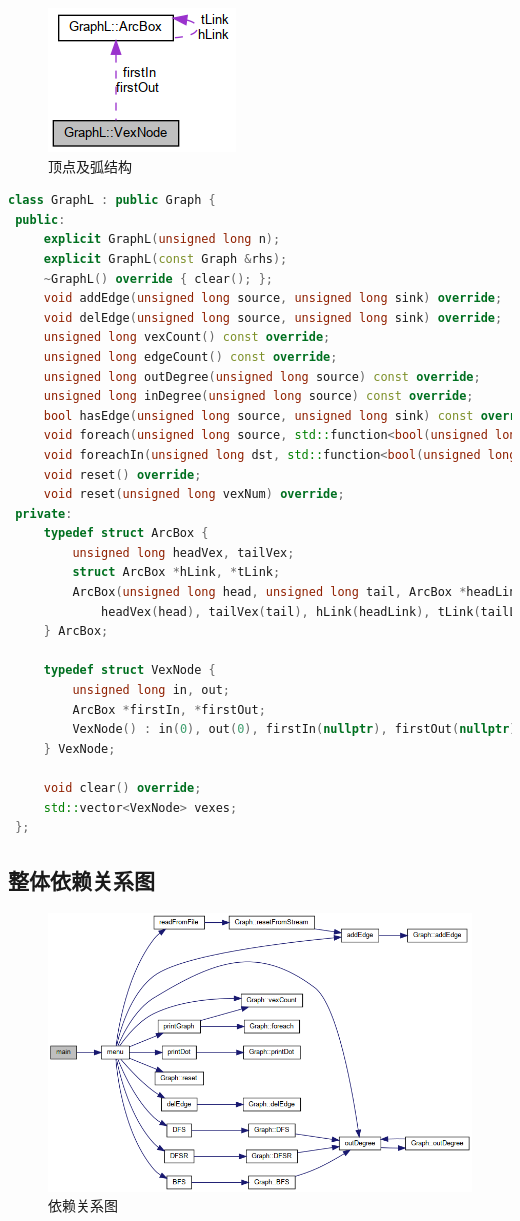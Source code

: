 \begin{figure}[H]
    \centering
    \includegraphics[width=0.2\linewidth]{figures/struct_graph_l_1_1_vex_node__coll__graph}
    \caption{顶点及弧结构}
    \label{fig:structgraphl11vexnodecollgraph}
\end{figure}

\begin{lstlisting}[language = c++]
 class GraphL : public Graph {
 public:
     explicit GraphL(unsigned long n);
     explicit GraphL(const Graph &rhs);
     ~GraphL() override { clear(); };
     void addEdge(unsigned long source, unsigned long sink) override;
     void delEdge(unsigned long source, unsigned long sink) override;
     unsigned long vexCount() const override;
     unsigned long edgeCount() const override;
     unsigned long outDegree(unsigned long source) const override;
     unsigned long inDegree(unsigned long source) const override;
     bool hasEdge(unsigned long source, unsigned long sink) const override;
     void foreach(unsigned long source, std::function<bool(unsigned long, unsigned long)> &func) const override;
     void foreachIn(unsigned long dst, std::function<bool(unsigned long, unsigned long)> &func) const;
     void reset() override;
     void reset(unsigned long vexNum) override;
 private:
     typedef struct ArcBox {
         unsigned long headVex, tailVex;
         struct ArcBox *hLink, *tLink;
         ArcBox(unsigned long head, unsigned long tail, ArcBox *headLink, ArcBox *tailLink) :
             headVex(head), tailVex(tail), hLink(headLink), tLink(tailLink) {}
     } ArcBox;
 
     typedef struct VexNode {
         unsigned long in, out;
         ArcBox *firstIn, *firstOut;
         VexNode() : in(0), out(0), firstIn(nullptr), firstOut(nullptr) {};
     } VexNode;
 
     void clear() override;
     std::vector<VexNode> vexes;
 };
\end{lstlisting}
\subsection{整体依赖关系图}

\begin{figure}[H]
    \centering
    \includegraphics[width=0.6\linewidth]{figures/_graph_main_8cpp__incl}
    \caption{依赖关系图}
    \label{fig:graphmain8cppincl}
\end{figure}


